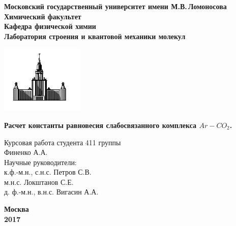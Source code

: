 \begin{titlepage}
\centering
\textbf{\large Московский государственный университет имени М.В.\,Ломоносова\\
\vspace*{0.1cm} Химический факультет\\
\vspace*{0.1cm}
\noindent\makebox[\linewidth]{\rule{\paperwidth}{0.4pt}}
\vspace*{0.1cm}
 Кафедра физической химии\\
\vspace*{0.1cm} Лаборатория строения и квантовой механики молекул \\}
\vspace*{2cm}

\begin{center}
\includegraphics[width=0.3\textwidth]{pictures/logo.jpg}
\end{center}

\vspace*{2cm}
\Large \textbf{Расчет константы равновесия слабосвязанного комплекса $Ar-CO_2$.}
\vspace*{2cm}

\begin{flushright}
\large Курсовая работа студента 411 группы\\
Финенко А.А.\\
\vspace{1cm}
Научные руководители:\\
к.ф.-м.н., с.н.с. Петров С.В. \\
м.н.с. Локштанов С.Е. \\
д. ф.-м.н., в.н.с. Вигасин А.А.
\end{flushright}
\vfill
\large\textbf{Москва\\ 2017}
\end{titlepage}

